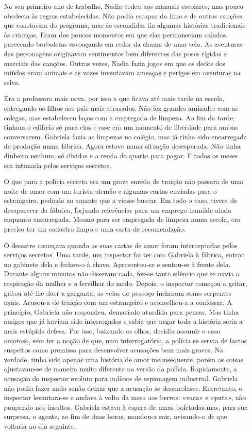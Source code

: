 No seu primeiro ano de trabalho, Nadia cedeu aos manuais escolares, mas
pouco obedecia às regras estabelecidas. Não podia escapar do hino e de
outras canções que constavam do programa, mas às escondidas lia algumas histórias tradicionais às crianças. Eram dos poucos momentos em que
elas permaneciam caladas, parecendo borboletas esvoaçando em redor da
chama de uma vela. As aventuras das personagens originavam sentimentos
bem diferentes das poses rígidas e marciais das canções. Outras vezes,
Nadia fazia jogos em que os dedos dos miúdos eram animais e as vozes
inventavam ameaças e perigos em aventuras na selva.

Era a professora mais nova, por isso a que ficava até mais tarde na
escola, entregando os filhos aos pais mais atrasados. Não fez grandes
amizades com as colegas, mas estabeleceu laços com a empregada de
limpeza. Ao fim da tarde, tinham o edifício só para elas e esse era um
momento de liberdade para ambas conversarem. Gabriela fazia as limpezas
no colégio, mas já tinha sido encarregada de produção numa fábrica.
Agora estava numa
situação desesperada. Não tinha dinheiro nenhum, só dívidas e a renda do
quarto para pagar. E todos os meses era intimada pelos serviços
secretos.

O que para a polícia secreta era um grave enredo de traição não passara
de uma noite de amor com um turista alemão e algumas cartas enviadas
para o estrangeiro, pedindo ao amante que a viesse buscar. Em todo o
caso, tivera de desaparecer da fábrica, forjando referências para um
emprego humilde ainda enquanto encarregada. Mesmo para ser empregada de
limpeza numa escola, era preciso ter um cadastro limpo e uma carta de
recomendação.

O desastre começara quando as suas cartas de amor foram interceptadas
pelos serviços secretos. Uma tarde, um inspector foi ter com Gabriela à
fábrica, entrou no gabinete dela e fechou-o à chave. Apresentou-se e
sentou-se à frente dela. Durante alguns minutos não disseram nada, fez-se
tanto silêncio que se ouvia a respiração da mulher e o fervilhar do
medo. Depois, o inspector começou a gritar, gritou até lhe doer a
garganta, as veias do pescoço incharam como serpentes azuis. Acusou-a de
traição com um estrangeiro e aconselhou-a a confessar. A princípio,
Gabriela não respondeu, demasiado aturdida para pensar. Mas tinha
amigos que já haviam sido interrogados e sabia que negar toda a história
seria a mais estúpida defesa. Por isso, baixando os olhos, decidiu assumir o caso amoroso, sem ter a noção de que, num interrogatório, a
polícia se servia de factos suspeitos como premissa para desenvolver
acusações bem mais graves. Na verdade, tinha sido apenas uma história de
amor inconsequente, porém as coisas ajustavam-se de maneira muito
diferente na
versão da polícia. Rapidamente, a acusação do inspector evoluiu para
indícios de espionagem industrial. Gabriela não podia fazer nada senão
deixar que a acusação se desenrolasse. Entretanto, o inspector
levantara-se e andava à volta da mesa aos berros: «vaca» e «puta», não
poupando nos insultos. Gabriela estava à espera de umas bofetadas mas,
para sua surpresa, o agente, ao fim de duas horas, mandou-a sair,
avisando-a de que voltaria no dia seguinte.

